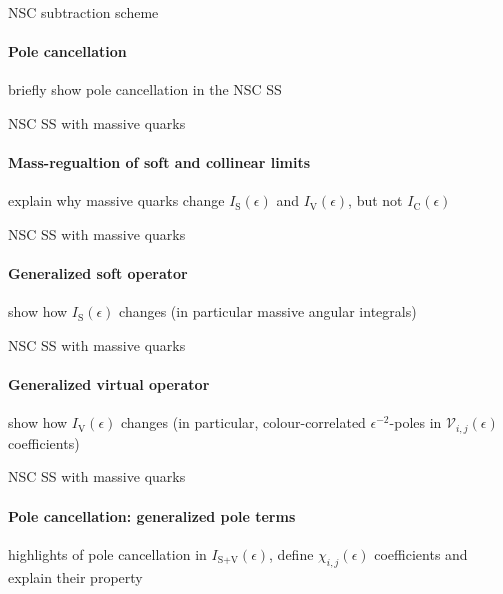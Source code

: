 
\begin{frame}{NSC subtraction scheme}
  \framesubtitle{Pole cancellation}

  briefly show pole cancellation in the NSC SS

\end{frame}


\begin{frame}{NSC SS with massive quarks}
  \framesubtitle{Mass-regualtion of soft and collinear limits}

  explain why massive quarks change $ I_\text{S}(\epsilon) $ and $ I_\text{V}(\epsilon) $, but not $ I_\text{C}(\epsilon) $

\end{frame}


\begin{frame}{NSC SS with massive quarks}
  \framesubtitle{Generalized soft operator}

  show how $ I_\text{S}(\epsilon) $ changes (in particular massive angular integrals)

\end{frame}


\begin{frame}{NSC SS with massive quarks}
  \framesubtitle{Generalized virtual operator}

  show how $ I_\text{V}(\epsilon) $ changes (in particular, colour-correlated $ \epsilon^{-2} $-poles in $ \mathcal{V}_{i,j}(\epsilon) $ coefficients)

\end{frame}


\begin{frame}{NSC SS with massive quarks}
  \framesubtitle{Pole cancellation: generalized pole terms}

  highlights of pole cancellation in $ I_{\text{S}+\text{V}}(\epsilon) $, define $ \chi_{i,j}(\epsilon) $ coefficients and explain their property

\end{frame}

